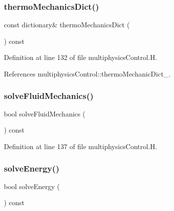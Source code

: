 \subsubsection{\texorpdfstring{thermo\+Mechanics\+Dict()}{thermoMechanicsDict()}}
{\footnotesize\ttfamily const dictionary\& thermo\+Mechanics\+Dict (\begin{DoxyParamCaption}{ }\end{DoxyParamCaption}) const\hspace{0.3cm}{\ttfamily [inline]}}



Definition at line 132 of file multiphysics\+Control.\+H.



References multiphysics\+Control\+::thermo\+Mechanic\+Dict\+\_\+.

\mbox{\label{classFoam_1_1multiphysicsControl_a7673cb2daf7aa992cc1c55e4f37b7d36}} 
\subsubsection{\texorpdfstring{solve\+Fluid\+Mechanics()}{solveFluidMechanics()}}
{\footnotesize\ttfamily bool solve\+Fluid\+Mechanics (\begin{DoxyParamCaption}{ }\end{DoxyParamCaption}) const\hspace{0.3cm}{\ttfamily [inline]}}



Definition at line 137 of file multiphysics\+Control.\+H.

\mbox{\label{classFoam_1_1multiphysicsControl_ad8fff023499dda7fdbd2c81a31861e0e}} 
\subsubsection{\texorpdfstring{solve\+Energy()}{solveEnergy()}}
{\footnotesize\ttfamily bool solve\+Energy (\begin{DoxyParamCaption}{ }\end{DoxyParamCaption}) const\hspace{0.3cm}{\ttfamily [inline]}}




